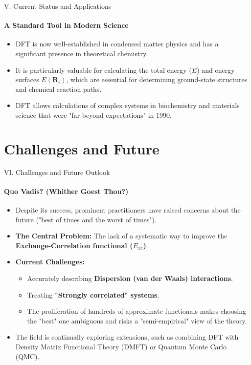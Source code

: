 \begin{frame}{\large V. Current Status and Applications}
    \framesubtitle{A Standard Tool in Modern Science}
    \begin{itemize}
        \item DFT is now well-established in condensed matter physics and has a significant presence in theoretical chemistry.
        \item It is particularly valuable for calculating the total energy ($E$) and energy surfaces $E(\mathbf{R}_i)$, which are essential for determining ground-state structures and chemical reaction paths.
        \item DFT allows calculations of complex systems in biochemistry and materials science that were "far beyond expectations" in 1990.
    \end{itemize}
\end{frame}

\section{Challenges and Future}

\begin{frame}{\large VI. Challenges and Future Outlook}
    \framesubtitle{Quo Vadis? (Whither Goest Thou?)}
    \begin{itemize}
        \item Despite its success, prominent practitioners have raised concerns about the future ("best of times and the worst of times").
        \item \textbf{The Central Problem:} The lack of a systematic way to improve the \textbf{Exchange-Correlation functional ($E_{xc}$)}.
        \item \textbf{Current Challenges:}
        \begin{itemize}
            \item Accurately describing \textbf{Dispersion (van der Waals) interactions}.
            \item Treating \textbf{"Strongly correlated" systems}.
            \item The proliferation of hundreds of approximate functionals makes choosing the "best" one ambiguous and risks a "semi-empirical" view of the theory.
        \end{itemize}
        \item The field is continually exploring extensions, such as combining DFT with Density Matrix Functional Theory (DMFT) or Quantum Monte Carlo (QMC).
    \end{itemize}
\end{frame}

